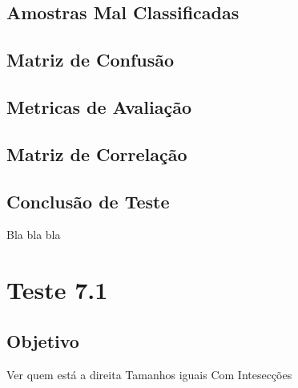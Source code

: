 \subsection{Amostras Mal Classificadas}
\subsection{Matriz de Confusão}
\subsection{Metricas de Avaliação}
\subsection{Matriz de Correlação}
\subsection{Conclusão de Teste}
    Bla bla bla

\newpage

\section{Teste 7.1}
\subsection{Objetivo}
    Ver quem está a direita
    Tamanhos iguais
    Com Intesecções
